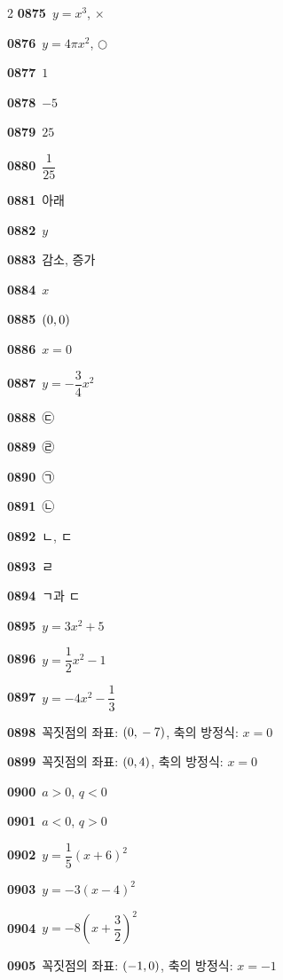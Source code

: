 \documentclass[10pt,a4paper]{article}
\begin{document}
\begin{multicols}{2}
\noindent\textbf{0875}\ $y=x^3$, $\times$\par
\noindent\textbf{0876}\ $y=4\pi x^2$, $\bigcirc$\par
\noindent\textbf{0877}\ $1$\par
\noindent\textbf{0878}\ $-5$\par
\noindent\textbf{0879}\ $25$\par
\noindent\textbf{0880}\ $\dfrac{1}{25}$\par
\noindent\textbf{0881}\ 아래\par
\noindent\textbf{0882}\ $y$\par
\noindent\textbf{0883}\ 감소, 증가\par
\noindent\textbf{0884}\ $x$\par
\noindent\textbf{0885}\ $(0{,}\mkern3mu 0)$\par
\noindent\textbf{0886}\ $x=0$\par
\noindent\textbf{0887}\ $y=-\dfrac{3}{4}x^2$\par
\noindent\textbf{0888}\ ㉢\par
\noindent\textbf{0889}\ ㉣\par
\noindent\textbf{0890}\ ㉠\par
\noindent\textbf{0891}\ ㉡\par
\noindent\textbf{0892}\ ㄴ, ㄷ\par
\noindent\textbf{0893}\ ㄹ\par
\noindent\textbf{0894}\ ㄱ과 ㄷ\par
\noindent\textbf{0895}\ $y=3x^2+5$\par
\noindent\textbf{0896}\ $y=\dfrac{1}{2}x^2-1$\par
\noindent\textbf{0897}\ $y=-4x^2-\dfrac{1}{3}$\par
\noindent\textbf{0898}\ 꼭짓점의 좌표: $(0{,}\mkern3mu -7)$, 축의 방정식: $x=0$\par
\noindent\textbf{0899}\ 꼭짓점의 좌표: $(0{,}\mkern3mu 4)$, 축의 방정식: $x=0$\par
\noindent\textbf{0900}\ $a>0$, $q<0$\par
\noindent\textbf{0901}\ $a<0$, $q>0$\par
\noindent\textbf{0902}\ $y=\dfrac{1}{5}(x+6)^2$\par
\noindent\textbf{0903}\ $y=-3(x-4)^2$\par
\noindent\textbf{0904}\ $y=-8\left(x+\dfrac{3}{2}\right)^2$\par
\noindent\textbf{0905}\ 꼭짓점의 좌표: $(-1{,}\mkern3mu 0)$, 축의 방정식: $x=-1$\par

\end{multicols}
\end{document}
